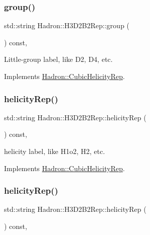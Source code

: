 \subsubsection{\texorpdfstring{group()}{group()}\hspace{0.1cm}{\footnotesize\ttfamily [5/5]}}
{\footnotesize\ttfamily std\+::string Hadron\+::\+H3\+D2\+B2\+Rep\+::group (\begin{DoxyParamCaption}{ }\end{DoxyParamCaption}) const\hspace{0.3cm}{\ttfamily [inline]}, {\ttfamily [virtual]}}

Little-\/group label, like D2, D4, etc. 

Implements \mbox{\hyperlink{structHadron_1_1CubicHelicityRep_a101a7d76cd8ccdad0f272db44b766113}{Hadron\+::\+Cubic\+Helicity\+Rep}}.

\mbox{\label{structHadron_1_1H3D2B2Rep_a3e941d14c5dea81e231504962222c3c5}} 
\subsubsection{\texorpdfstring{helicityRep()}{helicityRep()}\hspace{0.1cm}{\footnotesize\ttfamily [1/3]}}
{\footnotesize\ttfamily std\+::string Hadron\+::\+H3\+D2\+B2\+Rep\+::helicity\+Rep (\begin{DoxyParamCaption}{ }\end{DoxyParamCaption}) const\hspace{0.3cm}{\ttfamily [inline]}, {\ttfamily [virtual]}}

helicity label, like H1o2, H2, etc. 

Implements \mbox{\hyperlink{structHadron_1_1CubicHelicityRep_af1096946b7470edf0a55451cc662f231}{Hadron\+::\+Cubic\+Helicity\+Rep}}.

\mbox{\label{structHadron_1_1H3D2B2Rep_a3e941d14c5dea81e231504962222c3c5}} 
\subsubsection{\texorpdfstring{helicityRep()}{helicityRep()}\hspace{0.1cm}{\footnotesize\ttfamily [2/3]}}
{\footnotesize\ttfamily std\+::string Hadron\+::\+H3\+D2\+B2\+Rep\+::helicity\+Rep (\begin{DoxyParamCaption}{ }\end{DoxyParamCaption}) const\hspace{0.3cm}{\ttfamily [inline]}, {\ttfamily [virtual]}}

